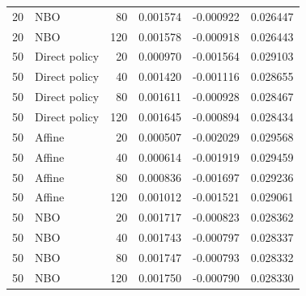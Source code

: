 {\begin{longtable}{rlrrrr}
20 & NBO & 80 & 0.001574 & -0.000922 & 0.026447 \\
20 & NBO & 120 & 0.001578 & -0.000918 & 0.026443 \\
50 & Direct policy & 20 & 0.000970 & -0.001564 & 0.029103 \\
50 & Direct policy & 40 & 0.001420 & -0.001116 & 0.028655 \\
50 & Direct policy & 80 & 0.001611 & -0.000928 & 0.028467 \\
50 & Direct policy & 120 & 0.001645 & -0.000894 & 0.028434 \\
50 & Affine & 20 & 0.000507 & -0.002029 & 0.029568 \\
50 & Affine & 40 & 0.000614 & -0.001919 & 0.029459 \\
50 & Affine & 80 & 0.000836 & -0.001697 & 0.029236 \\
50 & Affine & 120 & 0.001012 & -0.001521 & 0.029061 \\
50 & NBO & 20 & 0.001717 & -0.000823 & 0.028362 \\
50 & NBO & 40 & 0.001743 & -0.000797 & 0.028337 \\
50 & NBO & 80 & 0.001747 & -0.000793 & 0.028332 \\
50 & NBO & 120 & 0.001750 & -0.000790 & 0.028330 \\
\bottomrule\end{longtable}}
